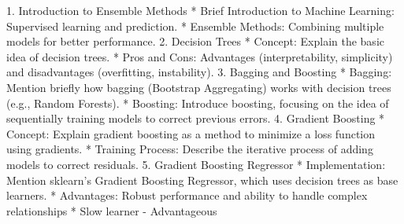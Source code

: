 1. Introduction to Ensemble Methods
    * Brief Introduction to Machine Learning: Supervised learning and prediction.
    * Ensemble Methods: Combining multiple models for better performance.
2. Decision Trees
    * Concept: Explain the basic idea of decision trees.
    * Pros and Cons: Advantages (interpretability, simplicity) and disadvantages (overfitting, instability).
3. Bagging and Boosting
    * Bagging: Mention briefly how bagging (Bootstrap Aggregating) works with decision trees (e.g., Random Forests).
    * Boosting: Introduce boosting, focusing on the idea of sequentially training models to correct previous errors.
4. Gradient Boosting
    * Concept: Explain gradient boosting as a method to minimize a loss function using gradients.
    * Training Process: Describe the iterative process of adding models to correct residuals.
5. Gradient Boosting Regressor
    * Implementation: Mention sklearn's Gradient Boosting Regressor, which uses decision trees as base learners.
    * Advantages: Robust performance and ability to handle complex relationships
    * Slow learner - Advantageous